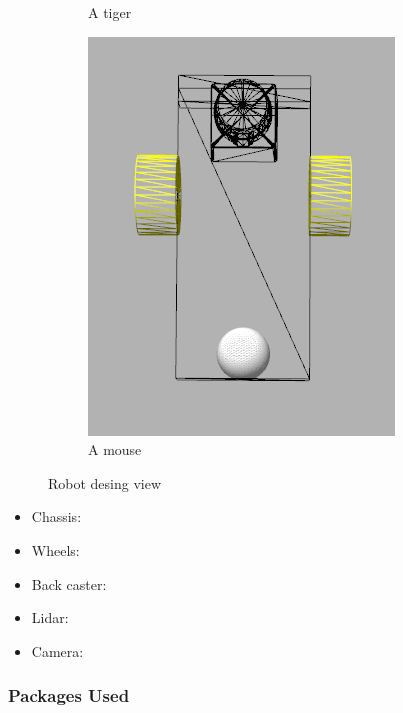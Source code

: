 \documentclass[10pt,journal,compsoc]{IEEEtran}
\begin{document}
\begin{figure}
\begin{subfigure}[b]{0.3\textwidth}
        \caption{A tiger}
        \label{fig:tiger}
    \end{subfigure}
    \begin{subfigure}[b]{0.3\textwidth}
        \includegraphics[width=\textwidth]{robokoko-design-3}
        \caption{A mouse}
        \label{fig:mouse}
    \end{subfigure}
    \caption{Robot desing view}\label{fig:animals}
\end{figure}

\begin{itemize}
\item Chassis:
\item Wheels:
\item Back caster:
\item Lidar:
\item Camera:
\end{itemize}

\subsubsection{Packages Used}
\end{document}
